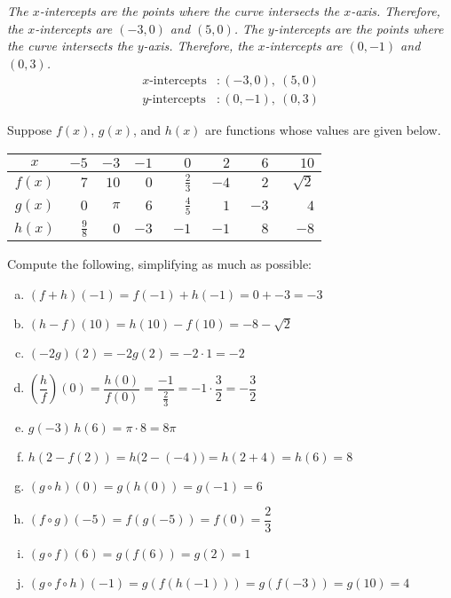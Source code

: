 \documentclass[12pt,letterpaper]{exam}
\begin{document}
\begin{questions}
{\noindent \itshape The $x$-intercepts are the points where the curve intersects the $x$-axis. Therefore, the $x$-intercepts are $(-3, 0)$ and $(5, 0)$. The $y$-intercepts are the points where the curve intersects the $y$-axis. Therefore, the $x$-intercepts are $(0, -1)$ and $(0, 3)$.
	\[
	\boxed{
	\begin{aligned}
	x\text{-intercepts}&\colon (-3, 0),\ (5, 0) \\
	y\text{-intercepts}&\colon (0, -1),\ (0, 3)
	\end{aligned}
	}
	\]
}



\newpage
\question[10] Suppose $f(x)$, $g(x)$, and $h(x)$ are functions whose values are given below.
        \begin{table}[!ht]
        \centering
        \begin{tabular}{| c || r | r | r | r | r | r | r |} \hline
	$x$ & $-5$ & $-3$ & $-1$ & $\phantom{-}0$ & $\phantom{-}2$ & $\phantom{-}6$ & $\phantom{-}10$ \\ \hline \hline
	$f(x)$ & $7$ & $10$ & $0$ & $\tfrac{2}{3}$ & $-4$ & $2$ & $\sqrt{2}$ \\ \hline
	$g(x)$ & $0$ & $\pi$ & $6$ & $\tfrac{4}{5}$ & $1$ & $-3$ & $4$ \\ \hline
	$h(x)$ & $\tfrac{9}{8}$ & $0$ & $-3$ & $-1$ & $-1$ & $8$ & $-8$ \\ \hline
        \end{tabular}
        \end{table}

Compute the following, simplifying as much as possible: \pspace
        \begin{enumerate}[(a)]
        \item $(f + h)(-1)= f(-1) + h(-1)= 0 + -3= -3$ \vfill
        \item $(h - f)(10)= h(10) - f(10)= -8 - \sqrt{2}$ \vfill
        \item $(-2g)(2)= -2g(2)= -2 \cdot 1= -2$ \vfill
        \item $\left( \dfrac{h}{f} \right)(0)= \dfrac{h(0)}{f(0)}= \dfrac{-1}{\tfrac{2}{3}}= -1 \cdot \dfrac{3}{2}= -\dfrac{3}{2}$ \vfill
        \item $g(-3)\, h(6)= \pi \cdot 8= 8\pi$ \vfill
        \item $h(2 - f(2))= h \big(2 - (-4) \big)= h(2 + 4)= h(6)= 8$ \vfill
        \item $(g \circ h)(0)= g(h(0))= g(-1)= 6$ \vfill
	\item $(f \circ g)(-5)= f(g(-5))= f(0)= \dfrac{2}{3}$ \vfill
        \item $(g \circ f)(6)= g(f(6))= g(2)= 1$ \vfill
	\item $(g \circ f \circ h)(-1)= g(f(h(-1)))= g(f(-3))= g(10)= 4$ \vfill
        \end{enumerate} 




\end{questions}
\end{document}
